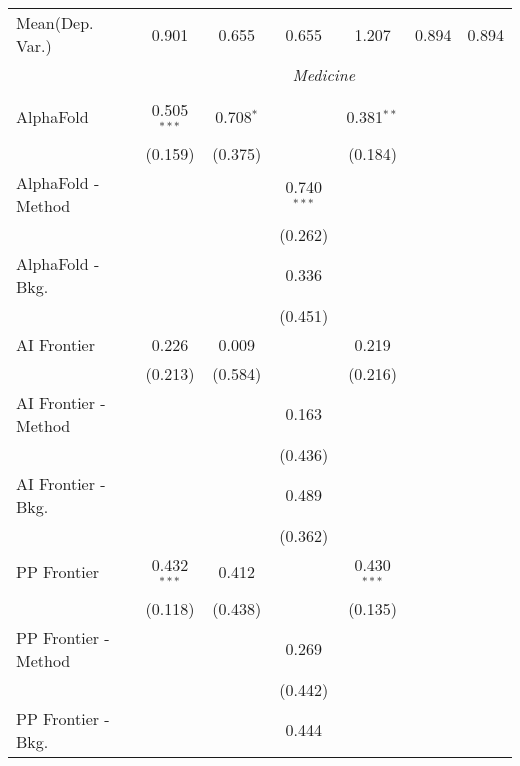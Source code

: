 \begin{tabular}{lcccccc}
Mean(Dep. Var.) & 0.901 & 0.655 & 0.655 & 1.207 & 0.894 & 0.894 \\
 & \multicolumn{6}{c}{\textit{Medicine}} \\ \\
   AlphaFold            & 0.505$^{***}$ & 0.708$^{*}$ &               & 0.381$^{**}$  &        &   \\   
                        & (0.159)       & (0.375)     &               & (0.184)       &        &   \\   
   AlphaFold - Method   &               &             & 0.740$^{***}$ &               &        &   \\   
                        &               &             & (0.262)       &               &        &   \\   
   AlphaFold - Bkg.     &               &             & 0.336         &               &        &   \\   
                        &               &             & (0.451)       &               &        &   \\   
   AI Frontier          & 0.226         & 0.009       &               & 0.219         &        &   \\   
                        & (0.213)       & (0.584)     &               & (0.216)       &        &   \\   
   AI Frontier - Method &               &             & 0.163         &               &        &   \\   
                        &               &             & (0.436)       &               &        &   \\   
   AI Frontier - Bkg.   &               &             & 0.489         &               &        &   \\   
                        &               &             & (0.362)       &               &        &   \\   
   PP Frontier          & 0.432$^{***}$ & 0.412       &               & 0.430$^{***}$ &        &   \\   
                        & (0.118)       & (0.438)     &               & (0.135)       &        &   \\   
   PP Frontier - Method &               &             & 0.269         &               &        &   \\   
                        &               &             & (0.442)       &               &        &   \\   
   PP Frontier - Bkg.   &               &             & 0.444         &               &        &   \\   

\end{tabular}
